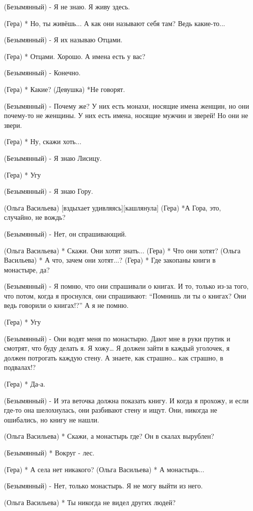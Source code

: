 (Безымянный) - Я не знаю. Я живу здесь.

(Гера) * Но, ты живёшь... А как они называют себя там? Ведь какие-то...

(Безымянный) - Я их называю Отцами.

(Гера) * Отцами. Хорошо. А имена есть у вас?

(Безымянный) - Конечно.

(Гера) * Какие?
(Девушка) *Не говорят.

(Безымянный) - Почему же? У них есть монахи, носящие имена женщин, но они почему-то не женщины. У них есть имена, носящие мужчин и зверей! Но они не звери.

(Гера) * Ну, скажи хоть...

(Безымянный) - Я знаю Лисицу.

(Гера) * Угу

(Безымянный) - Я знаю Гору.

(Ольга Васильева) [вздыхает удивляясь][кашлянула]
(Гера) *А Гора, это, случайно, не вождь?

(Безымянный) - Нет, он спрашивающий.

(Ольга Васильева) * Скажи. Они хотят знать...
(Гера) * Что они хотят?
(Ольга Васильева) * А что, зачем они хотят...?
(Гера) * Где закопаны книги в монастыре, да?

(Безымянный) - Я помню, что они спрашивали о книгах. И то, только из-за того, что потом, когда я проснулся, они спрашивают: “Помнишь ли ты о книгах? Они ведь говорили о книгах!?” А я не помню.

(Гера) * Угу

(Безымянный) - Они водят меня по монастырю. Дают мне в руки прутик и смотрят, что буду делать я. Я хожу… Я должен зайти в каждый уголочек, я должен потрогать каждую стену. А знаете, как страшно… как страшно, в подвалах!?

(Гера) * Да-а.

(Безымянный) - И эта веточка должна показать книгу. И когда я прохожу, и если где-то она шелохнулась, они разбивают стену и ищут. Они, никогда не ошибались, но книгу не нашли. 

(Ольга Васильева) * Скажи, а монастырь где? Он в скалах вырублен?

(Безымянный) * Вокруг -  лес.

(Гера) * А села нет никакого?
(Ольга Васильева) * А монастырь...

(Безымянный) - Нет, только монастырь. Я не могу выйти из него.

(Ольга Васильева) * Ты никогда не видел других людей?

